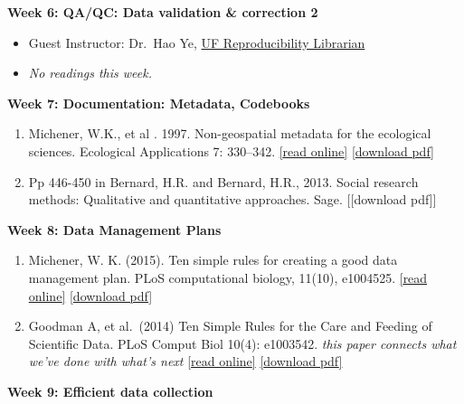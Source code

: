 \documentclass[
  12pt,
]{article}
\begin{document}
\textbf{Week 6: QA/QC: Data validation \& correction 2}

\begin{itemize}
\item
  Guest Instructor: Dr.~Hao Ye,
  \href{https://guides.uflib.ufl.edu/haoye}{UF Reproducibility
  Librarian}
\item
  \emph{No readings this week.}
\end{itemize}

\textbf{Week 7: Documentation: Metadata, Codebooks}

\begin{enumerate}
\def\labelenumi{\arabic{enumi}.}
\item
  Michener, W.K., et al . 1997. Non-geospatial metadata for the
  ecological sciences. Ecological Applications 7: 330--342.
  \href{https://esajournals.onlinelibrary.wiley.com/doi/abs/10.1890/1051-0761\%281997\%29007\%5B0330\%3ANMFTES\%5D2.0.CO\%3B2}{{[}read
  online{]}}
  \href{https://github.com/BrunaLab/LAS6292_DataManagement/blob/master/Assigned_Readings/Michener_etal_1997_EcolApplications.pdf}{{[}download
  pdf{]}}
\item
  Pp 446-450 in Bernard, H.R. and Bernard, H.R., 2013. Social research
  methods: Qualitative and quantitative approaches. Sage. {[}{[}download
  pdf{]}{]}
\end{enumerate}

\textbf{Week 8: Data Management Plans}

\begin{enumerate}
\def\labelenumi{\arabic{enumi}.}
\item
  Michener, W. K. (2015). Ten simple rules for creating a good data
  management plan. PLoS computational biology, 11(10), e1004525.
  \href{https://journals.plos.org/ploscompbiol/article?id=10.1371/journal.pcbi.1004525}{{[}read
  online{]}}
  \href{https://github.com/BrunaLab/LAS6292_DataManagement/blob/master/Assigned_Readings/Michener_2015_PloSBio.PDF}{{[}download
  pdf{]}}
\item
  Goodman A, et al.~(2014) Ten Simple Rules for the Care and Feeding of
  Scientific Data. PLoS Comput Biol 10(4): e1003542. \emph{\emph{this
  paper connects what we've done with what's next}}
  \href{https://doi.org/10.1371/journal.pcbi.1003542}{{[}read online{]}}
  \href{https://github.com/BrunaLab/LAS6292_DataManagement/blob/master/Assigned_Readings/Goodman_etal_2014.pdf}{{[}download
  pdf{]}}
\end{enumerate}

\textbf{Week 9: Efficient data collection}
\end{document}
